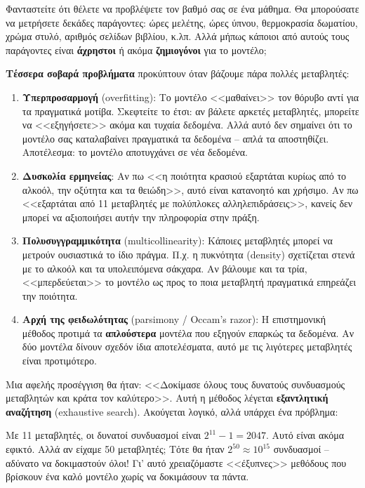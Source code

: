\documentclass[12pt,a4paper]{article}
\begin{document}
\begin{theorybox}[title={Πρόβλημα: Πολλές μεταβλητές, ποιες να κρατήσω;}]
Φανταστείτε ότι θέλετε να προβλέψετε τον βαθμό σας σε ένα μάθημα. Θα μπορούσατε να μετρήσετε δεκάδες παράγοντες: ώρες μελέτης, ώρες ύπνου, θερμοκρασία δωματίου, χρώμα στυλό, αριθμός σελίδων βιβλίου, κ.λπ. Αλλά μήπως κάποιοι από αυτούς τους παράγοντες είναι \textbf{άχρηστοι} ή ακόμα \textbf{ζημιογόνοι} για το μοντέλο;

\textbf{Τέσσερα σοβαρά προβλήματα} προκύπτουν όταν βάζουμε πάρα πολλές μεταβλητές:

\begin{enumerate}
    \item \textbf{Υπερπροσαρμογή} (overfitting): Το μοντέλο <<μαθαίνει>> τον θόρυβο αντί για τα πραγματικά μοτίβα. Σκεφτείτε το έτσι: αν βάλετε αρκετές μεταβλητές, μπορείτε να <<εξηγήσετε>> ακόμα και τυχαία δεδομένα. Αλλά αυτό δεν σημαίνει ότι το μοντέλο σας καταλαβαίνει πραγματικά τα δεδομένα -- απλά τα αποστηθίζει. Αποτέλεσμα: το μοντέλο αποτυγχάνει σε νέα δεδομένα.

    \item \textbf{Δυσκολία ερμηνείας}: Αν πω <<η ποιότητα κρασιού εξαρτάται κυρίως από το αλκοόλ, την οξύτητα και τα θειώδη>>, αυτό είναι κατανοητό και χρήσιμο. Αν πω <<εξαρτάται από 11 μεταβλητές με πολύπλοκες αλληλεπιδράσεις>>, κανείς δεν μπορεί να αξιοποιήσει αυτήν την πληροφορία στην πράξη.

    \item \textbf{Πολυσυγγραμμικότητα} (multicollinearity): Κάποιες μεταβλητές μπορεί να μετρούν ουσιαστικά το ίδιο πράγμα. Π.χ. η πυκνότητα (density) σχετίζεται στενά με το αλκοόλ και τα υπολειπόμενα σάκχαρα. Αν βάλουμε και τα τρία, <<μπερδεύεται>> το μοντέλο ως προς το ποια μεταβλητή πραγματικά επηρεάζει την ποιότητα.

    \item \textbf{Αρχή της φειδωλότητας} (parsimony / Occam's razor): Η επιστημονική μέθοδος προτιμά τα \textbf{απλούστερα} μοντέλα που εξηγούν επαρκώς τα δεδομένα. Αν δύο μοντέλα δίνουν σχεδόν ίδια αποτελέσματα, αυτό με τις λιγότερες μεταβλητές είναι προτιμότερο.
\end{enumerate}
\end{theorybox}

\begin{warningbox}
Μια αφελής προσέγγιση θα ήταν: <<Δοκίμασε όλους τους δυνατούς συνδυασμούς μεταβλητών και κράτα τον καλύτερο>>. Αυτή η μέθοδος λέγεται \textbf{εξαντλητική αναζήτηση} (exhaustive search). Ακούγεται λογικό, αλλά υπάρχει ένα πρόβλημα:

Με 11 μεταβλητές, οι δυνατοί συνδυασμοί είναι $2^{11} - 1 = 2047$. Αυτό είναι ακόμα εφικτό. Αλλά αν είχαμε 50 μεταβλητές; Τότε θα ήταν $2^{50} \approx 10^{15}$ συνδυασμοί -- αδύνατο να δοκιμαστούν όλοι! Γι' αυτό χρειαζόμαστε <<έξυπνες>> μεθόδους που βρίσκουν ένα καλό μοντέλο χωρίς να δοκιμάσουν τα πάντα.
\end{warningbox}
\end{document}
